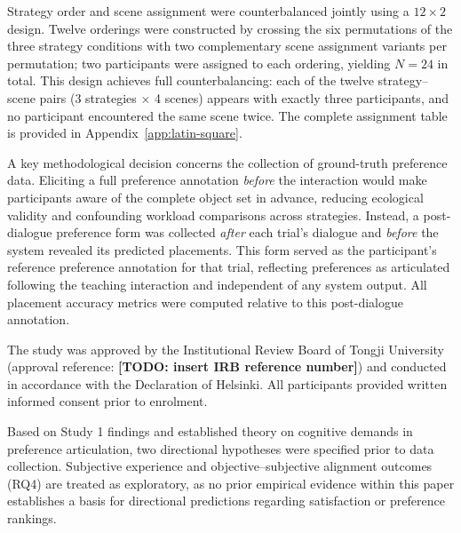 \documentclass[manuscript,review,anonymous]{acmart}
\begin{document}
Strategy order and scene assignment were counterbalanced jointly using a $12 \times 2$ design. Twelve orderings were constructed by crossing the six permutations of the three strategy conditions with two complementary scene assignment variants per permutation; two participants were assigned to each ordering, yielding $N = 24$ in total. This design achieves full counterbalancing: each of the twelve strategy--scene pairs (3 strategies $\times$ 4 scenes) appears with exactly three participants, and no participant encountered the same scene twice. The complete assignment table is provided in Appendix~\ref{app:latin-square}.

A key methodological decision concerns the collection of ground-truth preference data. Eliciting a full preference annotation \textit{before} the interaction would make participants aware of the complete object set in advance, reducing ecological validity and confounding workload comparisons across strategies. Instead, a post-dialogue preference form was collected \textit{after} each trial's dialogue and \textit{before} the system revealed its predicted placements. This form served as the participant's reference preference annotation for that trial, reflecting preferences as articulated following the teaching interaction and independent of any system output. All placement accuracy metrics were computed relative to this post-dialogue annotation.

The study was approved by the Institutional Review Board of Tongji University (approval reference: \textbf{[TODO: insert IRB reference number]}) and conducted in accordance with the Declaration of Helsinki. All participants provided written informed consent prior to enrolment.

Based on Study 1 findings and established theory on cognitive demands in preference articulation, two directional hypotheses were specified prior to data collection. Subjective experience and objective--subjective alignment outcomes (RQ4) are treated as exploratory, as no prior empirical evidence within this paper establishes a basis for directional predictions regarding satisfaction or preference rankings.
\end{document}
